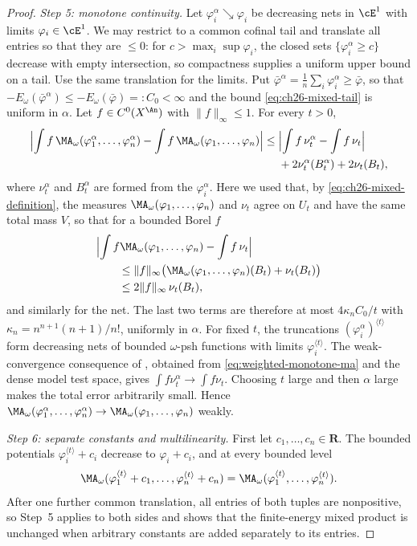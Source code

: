 \begin{proof}
\emph{Step 5: monotone continuity.}  Let $\varphi_i^\alpha\searrow\varphi_i$
be decreasing nets in $\cE^1$ with limits $\varphi_i\in\cE^1$.
We may restrict to a common cofinal tail and translate all entries so that
they are $\leq0$: for $c>\max_i\sup\varphi_i$, the closed sets
$\{\varphi_i^\alpha\geq c\}$ decrease with empty intersection, so
compactness supplies a uniform upper bound on a tail.  Use the same
translation for the limits.  Put
$\bar\varphi^\alpha=\frac1n\sum_i\varphi_i^\alpha\geq\bar\varphi$, so that
$-E_\omega(\bar\varphi^\alpha)\leq-E_\omega(\bar\varphi)=:C_0<\infty$ and
the bound \eqref{eq:ch26-mixed-tail} is uniform in $\alpha$.  Let
$f\in C^0(X^{\An})$ with $\lVert f\rVert_\infty\leq1$.  For every
$t>0$,
\[
\begin{split}
 \Bigl|\int f\,\MA_\omega(\varphi_1^\alpha,\ldots,\varphi_n^\alpha)
      -\int f\,\MA_\omega(\varphi_1,\ldots,\varphi_n)\Bigr|
 \leq{}&\Bigl|\int f\,\nu_t^\alpha-\int f\,\nu_t\Bigr|\\
 &+2\nu_t^\alpha(B_t^\alpha)+2\nu_t(B_t),
\end{split}
\]
where $\nu^\alpha_t$ and $B_t^\alpha$ are formed from the
$\varphi_i^\alpha$.  Here we used that, by
\eqref{eq:ch26-mixed-definition}, the measures
$\MA_\omega(\varphi_1,\ldots,\varphi_n)$ and $\nu_t$ agree on $U_t$ and
have the same total mass $V$, so that for a bounded Borel $f$
\[
 \begin{aligned}
 &\Bigl|\int f\MA_\omega(\varphi_1,\ldots,\varphi_n)-\int f\,\nu_t\Bigr|\\
 &\qquad\leq\lVert f\rVert_\infty
   \bigl(\MA_\omega(\varphi_1,\ldots,\varphi_n)(B_t)+\nu_t(B_t)\bigr)\\
 &\qquad\leq2\lVert f\rVert_\infty\,\nu_t(B_t),
 \end{aligned}
\]
and similarly for the net.  The last two terms are therefore at most
$4\kappa_nC_0/t$ with
$\kappa_n=n^{n+1}(n+1)/n!$, uniformly in $\alpha$.  For fixed $t$, the
truncations $(\varphi_i^\alpha)^{\langle t\rangle}$ form decreasing nets of
bounded $\omega$-psh functions with limits
$\varphi_i^{\langle t\rangle}$.  The weak-convergence consequence of
, obtained from
\eqref{eq:weighted-monotone-ma} and the dense model test space, gives
$\int f\nu^\alpha_t\to\int f\nu_t$.  Choosing $t$ large and then
$\alpha$ large makes the total error arbitrarily small.  Hence
$\MA_\omega(\varphi_1^\alpha,\ldots,\varphi_n^\alpha)\to
\MA_\omega(\varphi_1,\ldots,\varphi_n)$ weakly.

\emph{Step 6: separate constants and multilinearity.}  First let
$c_1,\ldots,c_n\in\mathbf R$.  The bounded potentials
$\varphi_i^{\langle t\rangle}+c_i$ decrease to $\varphi_i+c_i$, and
at every bounded level
\[
\MA_\omega(\varphi_1^{\langle t\rangle}+c_1,\ldots,
                  \varphi_n^{\langle t\rangle}+c_n)
 =\MA_\omega(\varphi_1^{\langle t\rangle},\ldots,
                  \varphi_n^{\langle t\rangle}).
\]
After one further common translation, all entries of both tuples are
nonpositive, so Step~5 applies to both sides and shows that the
finite-energy mixed product is unchanged when arbitrary constants are added
separately to its entries.


\end{proof}

